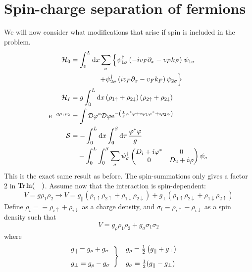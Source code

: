 \section{Spin-charge separation of fermions} %

We will now consider what modifications that arise if spin is included in the problem.
\begin{align*}
\mathcal{H}_0 &= \int_0^L\dd{x}\sum_\sigma\left\{\psi_{1\sigma}^\dagger\left(-iv_F\partial_x -v_Fk_F\right)\right.\psi_{1\sigma} \\ 
&\qquad\qquad\left.+\psi_{2\sigma}^\dagger\left(iv_F\partial_x -v_Fk_F\right)\psi_{2\sigma}\right\} \\
\mathcal{H}_I &= g\int_0^L\dd{x}\left(\rho_{1\uparrow} +\rho_{2\downarrow} \right)\left(\rho_{2\uparrow}+\rho_{2\downarrow}\right)\\
\mathrm{e}^{-g\rho_1\rho_2}&=\int\mathcal{D}\varphi^*\mathcal{D}\varphi\mathrm{e}^{-\left(\frac1g\varphi^*\varphi + i\varphi_1\varphi^*+i\rho_2\varphi\right)}\\
\mathcal{S} &= -\int_0^L\dd{x}\int_0^\beta\dd{\tau}\frac{\varphi^*\varphi}{g} \\ 
&\quad -\int_0^L\int_0^\beta\sum_\sigma\psi_\sigma^\dagger \begin{pmatrix}
D_i+i\varphi^* & 0\\
0& D_2+i\varphi
\end{pmatrix}\psi_\sigma
\end{align*}
This is the exact same result as before. The spin-summations only gives a factor 2 in \(\Tr\ln(\quad)\). Assume now that the interaction is spin-dependent:
\[V = g\rho_1\rho_2 \rightarrow V= g_{||}(\rho_{1\uparrow}\rho_{2\uparrow}+\rho_{1\downarrow}\rho_{2\downarrow}) + g_\perp(\rho_{1\uparrow}\rho_{2\downarrow}+\rho_{1\downarrow}\rho_{2\uparrow})\]
Define \(\rho_i = \equiv \rho_{i\uparrow}+\rho_{i\downarrow}\) as a charge density, and \(\sigma_i\equiv\rho_{i\uparrow}-\rho_{i\downarrow}\) as a spin density such that \[V = g_\rho\rho_1\rho_2 +g_\sigma\sigma_1\sigma_2\]
where
\begin{align}
\begin{split}
\label{eq:interaction_strength}
\left.\begin{array}{@{}l}
g_{||} = g_\rho + g_\sigma \\[2ex]
g_\perp = g_\rho-g_\sigma
\end{array}\right\} &\quad
\begin{array}{@{}l}
g_\rho = \frac12\left(g_{||}+g_\perp\right) \\[2ex]
g_\sigma=\frac12 (g_{||}-g_\perp)
\end{array}
\end{split}
\end{align}

